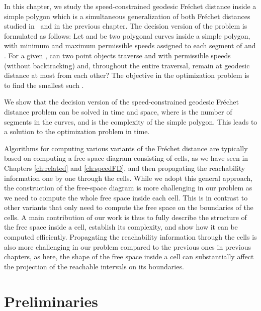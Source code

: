 \documentclass[12pt]{dalthesis}
\newcommand{\REM}[1]{}
\newcommand{\Frechet}{Fr\'echet }
\begin{document}
In this chapter, we study the speed-constrained geodesic \Frechet distance inside a simple polygon
which is a simultaneous generalization of both 
\Frechet distances studied in~\cite{WenkC08a} and in the previous
chapter.
The decision version of the problem is formulated as follows:
Let  and  be two polygonal curves inside a simple polygon, with minimum and maximum permissible speeds assigned to each segment of  and .
For a given , 
can two point objects traverse
 and  with permissible speeds (without backtracking) and, 
throughout the entire traversal, remain at geodesic distance at 
most  from each other? The objective in the 
optimization problem is to find the smallest such . 

We show that the decision version of the speed-constrained geodesic \Frechet distance problem 
can be solved in  time and  space,
where  is the number of segments in the curves,
and  is the complexity of the simple polygon.
This leads to a solution to the optimization problem
in  time.

Algorithms for computing various variants of the \Frechet distance
are typically based on computing a free-space diagram consisting of  cells,
as we have seen in Chapters \ref{ch:related} and 
\ref{ch:speedFD},
and then propagating the reachability information 
one by one through the cells. While we adopt this general approach, 
the construction of the free-space diagram is more challenging in our problem
as we need to compute the whole free space inside each cell.
This is in contrast to other variants that only need to compute the free space on the boundaries of the cells.
A main contribution of our work is thus to 
fully describe the structure of the free space inside a cell,
establish its complexity,
and show how it can be computed efficiently.
Propagating the reachability information through the cells is also
more challenging  in our problem compared to the previous ones in previous chapters, 
as here, the shape of the free space inside a cell can
substantially affect the projection of the reachable intervals on its boundaries.


\REM{
The rest of the paper is organized as follows.  
We defines the problem formally in Section~\ref{sec:preliminaries} along with some notations.
Section~\ref{sec:ComputingFreeSpace} describes the structure of the free space 
and presents an algorithm for computing it efficiently. 
In Section \ref{sec:decision}, 
we propose an algorithm to compute our variant of the \Frechet distance. 
}


\section{Preliminaries} 
\label{sec:preliminaries}
\end{document}

